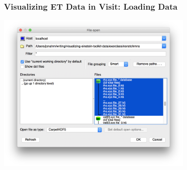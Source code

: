 \documentclass[]{beamer}
\begin{document}
\begin{frame}
  \frametitle{Visualizing ET Data in Visit: Loading Data}
  \begin{center}
    \includegraphics[height=8cm]{figures/visit/visit-open-rho}
  \end{center}
\end{frame}
\end{document}

